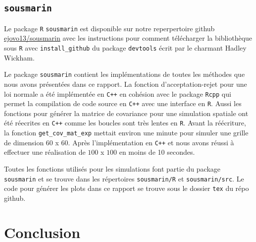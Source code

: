 \documentclass[10pt]{article} %
\begin{document}



\subsection{\texttt{sousmarin}}
Le package \texttt{R} \texttt{sousmarin} est disponible sur notre reperpertoire github \href{https://github.com/ejovo13/sousmarin}{ejovo13/sousmarin} avec les instructions pour comment télécharger la bibliothèque
sous \texttt{R} avec \texttt{install\_github} du package \texttt{devtools} écrit par le charmant Hadley Wickham.

Le package \texttt{sousmarin} contient les implémentations de toutes les méthodes que nous avons présentées dans ce rapport. La fonction d'acceptation-rejet pour une loi normale a été implémentée en \texttt{C++} en cohésion
avec le package \texttt{Rcpp} qui permet la compilation de code source en \texttt{C++} avec une interface en \texttt{R}. Aussi les fonctions pour générer la matrice de covariance pour une simulation
spatiale ont été réecrites en \texttt{C++} comme les boucles sont très lentes en \texttt{R}. Avant la réécriture, la fonction \texttt{get\_cov\_mat\_exp} mettait environ une minute pour simuler une grille
de dimension $60$ x $60$. Après l'implémentation en \texttt{C++} et nous avons réussi à effectuer une réalisation de $100$ x $100$ en moins de 10 secondes.

Toutes les fonctions utilisés pour les simulations font partie du package \texttt{sousmarin} et se trouve dans les répertoires \texttt{sousmarin/R} et \texttt{sousmarin/src}. Le code pour générer
les plots dans ce rapport se trouve sous le dossier \texttt{tex} du répo github.

\section{Conclusion}
\end{document}
